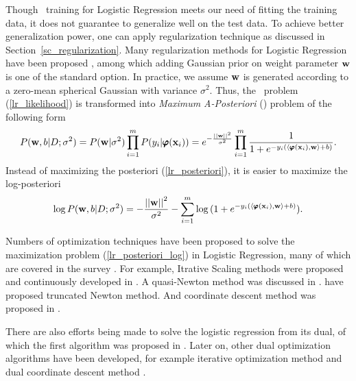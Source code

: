 {%
Though \mle\ training for Logistic Regression meets our need of fitting the training data, it does not guarantee to generalize well on the test data.
To achieve better generalization power, one can apply regularization technique as discussed in Section~\ref{sc_regularization}.
Many regularization methods for Logistic Regression have been proposed \citep{Chen99,Chen00,Goodman03}, among which adding Gaussian prior on weight parameter $\mathbf {w}$ is one of the standard option.
In practice, we assume $\mathbf {w}$ is generated according to a zero-mean spherical Gaussian with variance $\sigma^2$.
Thus, the \mle\ problem (\ref{lr_likelihood}) is transformed into \textit{Maximum A-Posteriori} (\map) problem of the following form
\begin{align}
	P(\mathbf {w},b|D;\sigma^2) = P(\mathbf {w}|\sigma^2)\prod_{i=1}^mP(y_i|\pmb \varphi(\mathbf {x}_i))=e^{ -\frac{\left|\left| \mathbf {w} \right|\right|^2}{\sigma^2} }\prod_{i=1}^{m}{\frac{1}{1+e^{ -y_i(\langle \pmb \varphi(\mathbf {x}_i), \mathbf {w} \rangle+b) }}}. \label{lr_posteriori}
\end{align}
Instead of maximizing the posteriori (\ref{lr_posteriori}), it is easier to maximize the log-posteriori
\begin{align}
	\log P(\mathbf {w},b|D;\sigma^2) = -{\frac{\left|\left| \mathbf {w} \right|\right|^2}{\sigma^2}} - \sum_{i=1}^{m}\log{(1+e^{ -y_i(\langle \pmb \varphi(\mathbf {x}_i), \mathbf {w}\rangle+b) })}. \label{lr_posteriori_log}
\end{align}

Numbers of optimization techniques have been proposed to solve the maximization problem (\ref{lr_posteriori_log}) in Logistic Regression, many of which are covered in the survey \citep{Minka03}.
For example, {Itrative Scaling} methods were proposed and continuously developed in \citep{Darroch72,Pietra97inducing,Berger97,Goodman02Sequential,Jin03a}.
A quasi-Newton method was discussed in \citep{Minka03}.
\citet{Komarek05making,Lin2008trust} have proposed truncated Newton method.
And coordinate descent method was proposed in \citep{Huang09iterative}.

There are also efforts being made to solve the logistic regression from its dual, of which the first algorithm was proposed in \citep{Jaakkola99probabilistic}.
Later on, other dual optimization algorithms have been developed, for example iterative optimization method \citep{Keerthi05a} and dual coordinate descent method \citep{Yu11dual}.


}
